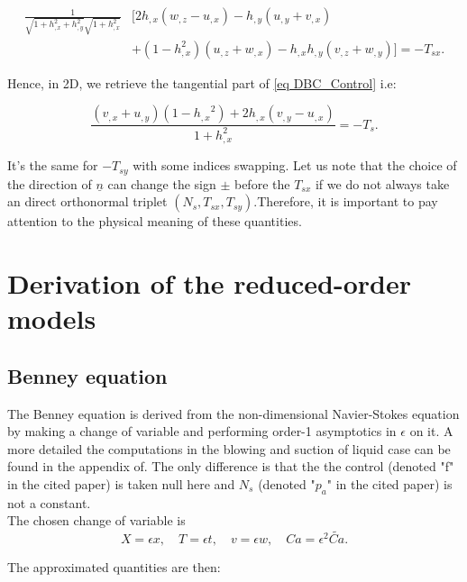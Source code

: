 \documentclass[12pt]{article}
\begin{document}
\begin{align*}
    \frac{1}{\sqrt{1+h_{,x}^2+h_{,y}^2}\sqrt{1+h_{,x}^2}} &\Big[
        2h_{,x}(w_{,z}-u_{,x})-h_{,y}(u_{,y}+v_{,x})\\
    &+(1-h_{,x}^2)(u_{,z}+w_{,x}) -h_{,x}h_{,y}(v_{,z}+w_{,y}) \Big]
    = -T_{sx}.
\end{align*}


Hence, in 2D, we retrieve the tangential part of \eqref{eq DBC_Control} i.e: 

\begin{equation*}
    \boxed{
    \frac{(v_{,x} + u_{,y})(1-{h_{,x}}^2)+2h_{,x}(v_{,y}-u_{,x})}{1+h_{,x}^2}= -T_s.}
\end{equation*} 

It's the same for $-T_{sy}$ with some indices swapping. Let us note that the choice of the direction of $\underline{n}$ can change the sign $\pm$ before the $T_{sx}$ if we do not always take an direct orthonormal triplet $(N_s, T_{sx}, T_{sy})$.Therefore, it is important to pay attention to the physical meaning of these quantities.  

\section{Derivation of the reduced-order models}
\subsection{Benney equation}\label{appendix:Benney_eq}
The Benney equation is derived from the non-dimensional Navier-Stokes equation by making a change of variable and performing order-1 asymptotics in $\epsilon$ on it. A more detailed the computations in the blowing and suction of liquid case can be found in the appendix of\cite{A_Thompson_FLF_blowing_suction}. The only difference is that the the control (denoted "f" in the cited paper) is taken null here and $N_s$ (denoted "$p_a$" in the cited paper) is not a constant. 
\\ 

The chosen change of variable is $$X=\epsilon x, \quad T=\epsilon t, \quad v=\epsilon w, \quad Ca=\epsilon^2 \tilde{Ca}.$$

The approximated quantities are then: 
\end{document}

